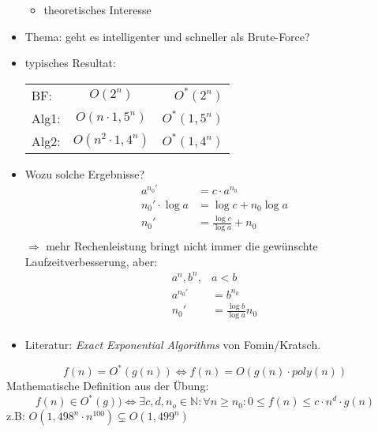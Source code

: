 \begin{itemize}
\begin{itemize}
    \item theoretisches Interesse
   \end{itemize}
   \item Thema: geht es intelligenter und schneller als Brute-Force?
   \item typisches Resultat: \\
   \begin{tabular}{lcr}
      BF: &$O(2^n)$ & $O^*(2^n)$\\ 
      Alg1: &$O(n\cdot 1,5^n)$ &$O^*(1,5^n)$\\ 
      Alg2: &$O(n^2\cdot 1,4^n)$ &$O^*(1,4^n)$\\
   \end{tabular}
   \item Wozu solche Ergebnisse? \\
   \begin{align*}
    a^{n_0'} &= c\cdot a^{n_0}\\
    n_0' \cdot \log a &= \log c + n_0 \log a\\
    n_0' &= \frac{\log c}{\log a} + n_0\\
   \end{align*}
   $\Rightarrow$ mehr Rechenleistung bringt nicht immer die gewünschte Laufzeitverbesserung, aber:
   \begin{align*}
    a^n, b^n, &a < b\\
    a^{n_0'} &= b^{n_0}\\
    n_0' &= \frac{\log b}{\log a} n_0\\
   \end{align*}
   \item Literatur: \textit{Exact Exponential Algorithms} von Fomin/Kratsch.
  \end{itemize}
  
  \begin{definition}[$O^*$-Notation]
   \[f(n) = O^*(g(n)) \Leftrightarrow f(n) = O(g(n)\cdot poly(n))\]
   Mathematische Definition aus der Übung:
   \[f(n) \in O^*(g)) \Leftrightarrow  \exists c,d,n_o \in \mathbb{N}: \forall n \geq n_0: 0 \leq f(n) \leq c\cdot n^d\cdot g(n)\]
   z.B: $O(1,498^n\cdot n^{100}) \subsetneq O(1,499^n)$
  \end{definition}

